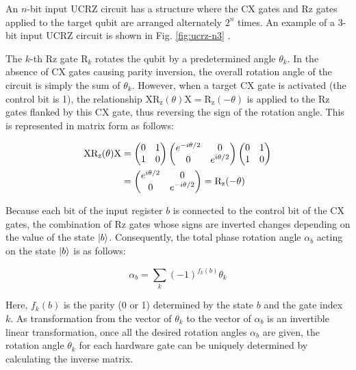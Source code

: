 \documentclass[manuscript_main.tex]{subfiles}
\begin{document}
An $n$-bit input UCRZ circuit has a structure where the CX gates and Rz gates
applied to the target qubit are arranged alternately $2^n$ times. An example of
a 3-bit input UCRZ circuit is shown in Fig. \ref{fig:ucrz-n3}
\cite{Mottonen2004.PhysRevLett.93.130502}.

The $k$-th Rz gate $\mathrm{R}_k$ rotates the qubit by a predetermined angle
$\theta_k$. In the absence of CX gates causing parity inversion, the overall
rotation angle of the circuit is simply the sum of $\theta_k$. However, when a
target CX gate is activated (the control bit is 1), the relationship
$\mathrm{X}\mathrm{R_z}(\theta)\mathrm{X} = \mathrm{R_z}(-\theta)$ is applied to
the Rz gates flanked by this CX gate, thus reversing the sign of the rotation angle.
This is represented in matrix form as follows:

\begin{align}
    \mathrm{X}\mathrm{R_z}(\theta)\mathrm{X}
    &= \begin{pmatrix} 0 & 1 \\ 1 & 0 \end{pmatrix}
    \begin{pmatrix} e^{-i\theta/2} & 0 \\ 0 & e^{i\theta/2} \end{pmatrix}
    \begin{pmatrix} 0 & 1 \\ 1 & 0 \end{pmatrix} \notag\\
    &= \begin{pmatrix} e^{i\theta/2} & 0 \\ 0 & e^{-i\theta/2} \end{pmatrix}
    = \mathrm{R_z}(-\theta)
\end{align}

Because each bit of the input register $b$ is connected to the control bit of
the CX gates, the combination of Rz gates whose signs are inverted changes
depending on the value of the state $\ket{b}$. Consequently, the total phase
rotation angle $\alpha_b$ acting on the state $\ket{b}$ is as follows:

\begin{equation}
    \alpha_b = \sum_{k}{(-1)^{f_k(b)}\theta_k}
\end{equation}

Here, $f_k(b)$ is the parity (0 or 1) determined by the state $b$ and the gate
index $k$. As transformation from the vector of $\theta_k$ to the vector
of $\alpha_b$ is an invertible linear transformation, once all the desired 
rotation angles $\alpha_b$ are given, the rotation angle $\theta_k$ for each
hardware gate can be uniquely determined by calculating the inverse matrix.
\end{document}
